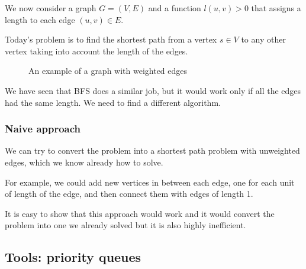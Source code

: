 \documentclass[10pt]{extarticle}
\begin{document}
We now consider a graph $G = (V, E)$ and a function $l(u, v) > 0$ that assigns a length to each edge $(u, v) \in E$.

Today's problem is to find the shortest path from a vertex $s \in V$ to any other vertex taking into account the length of the edges.

\begin{figure}[H]
    \centering

    \caption{An example of a graph with weighted edges} \label{fig:weightedgraph}
\end{figure}

We have seen that BFS does a similar job, but it would work only if all the edges had the same length. We need to find a different algorithm.

\subsubsection{Naive approach}

We can try to convert the problem into a shortest path problem with unweighted edges, which we know already how to solve.

For example, we could add new vertices in between each edge, one for each unit of length of the edge, and then connect them with edges of length 1.

It is easy to show that this approach would work and it would convert the problem into one we already solved but it is also highly inefficient.

\subsection{Tools: priority queues}
\end{document}
